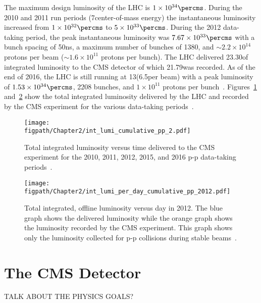 The maximum design luminosity of the LHC is $1\times10^{34}\percms$.
During the 2010 and 2011 run periods (7\TeV center-of-mass energy) the instantaneous luminosity increased from $1\times10^{32}\percms$ to $5\times10^{33}\percms$.
During the 2012 data-taking period, the peak instantaneous luminosity was $7.67\times10^{33}\percms$ with a bunch spacing of 50\unit{ns}, a maximum number of bunches of 1380, and $\sim2.2\times10^{14}$ protons per beam ($\sim1.6\times10^{11}$ protons per bunch).
The LHC delivered 23.30\fbinv of integrated luminosity to the CMS detector of which 21.79\fbinv was recorded.
As of the end of 2016, the LHC is still running at 13\TeV (6.5\TeV per beam) with a peak luminosity of $1.53\times10^{34}\percms$, 2208 bunches, and $1\times10^{11}$ protons per bunch~\cite{CMSWebBasedMonitoring,LumiPublic}.
Figures~\ref{fig:LHC_int_lumi_pp} and~\ref{fig:LHC_lumi_per_day_pp} show the total integrated luminosity delivered by the LHC and recorded by the CMS experiment for the various data-taking periods~\cite{LumiPublic}.

\begin{figure}[!hbt]
    \centering
    \texttt{[image: \\figpath/Chapter2/int\_lumi\_cumulative\_pp\_2.pdf]}
    \caption{Total integrated luminosity versus time delivered to the CMS experiment for the 2010, 2011, 2012, 2015, and 2016 p-p data-taking periods~\cite{LumiPublic}.}
    \label{fig:LHC_int_lumi_pp}
\end{figure}

\begin{figure}[!hbt]
    \centering
    \texttt{[image: \\figpath/Chapter2/int\_lumi\_per\_day\_cumulative\_pp\_2012.pdf]}
    \caption{Total integrated, offline luminosity versus day in 2012. The blue graph shows the delivered luminosity while the orange graph shows the luminosity recorded by the CMS experiment. This graph shows only the luminosity collected for p-p collisions during stable beams~\cite{LumiPublic}.}
    \label{fig:LHC_lumi_per_day_pp}
\end{figure}


\section{The CMS Detector}

TALK ABOUT THE PHYSICS GOALS?

